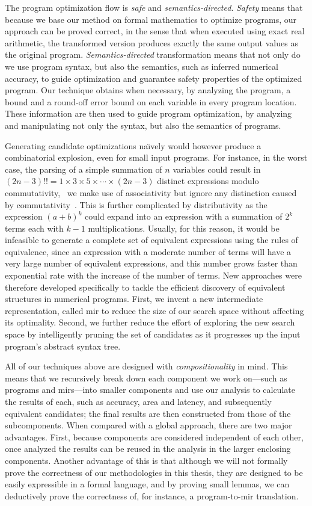 The program optimization flow is \emph{safe} and \emph{semantics-directed}.
\emph{Safety} means that because we base our method on formal mathematics to
optimize programs, our approach can be proved correct, in the sense that when
executed using exact real arithmetic, the transformed version produces exactly
the same output values as the original program. \emph{Semantics-directed}
transformation means that not only do we use program syntax, but also the
semantics, such as inferred numerical accuracy, to guide optimization and
guarantee safety properties of the optimized program.  Our technique obtains
when necessary, by analyzing the program, a bound and a round-off error bound
on each variable in every program location.  These information are then used to
guide program optimization, by analyzing and manipulating not only the syntax,
but also the semantics of programs.

Generating candidate optimizations na{\"\i}vely would however produce a
combinatorial explosion, even for small input programs.  For instance, in the
worst case, the parsing of a simple summation of $n$ variables could result
in $(2n - 3)!! = 1 \times 3 \times 5 \times \cdots \times (2n - 3)$ distinct
expressions modulo commutativity, \ie~we make use of associativity but ignore
any distinction caused by commutativity~\cite{ioualalen, mouilleron}.  This is
further complicated by distributivity as the expression ${(a + b)}^k$ could
expand into an expression with a summation of $2^k$ terms each with $k - 1$
multiplications.  Usually, for this reason, it would be infeasible to generate
a complete set of equivalent expressions using the rules of equivalence, since
an expression with a moderate number of terms will have a very large number of
equivalent expressions, and this number grows faster than exponential rate with
the increase of the number of terms.  New approaches were therefore developed
specifically to tackle the efficient discovery of equivalent structures in
numerical programs.  First, we invent a new intermediate representation,
called \gls{mir} to reduce the size of our search space without affecting its
optimality.  Second, we further reduce the effort of exploring the new search
space by intelligently pruning the set of candidates as it progresses up the
input program's abstract syntax tree.

All of our techniques above are designed with \emph{compositionality} in mind.
This means that we recursively break down each component we work on---such
as programs and \glspl{mir}---into smaller components and use our analysis
to calculate the results of each, such as accuracy, area and latency, and
subsequently equivalent candidates; the final results are then constructed from
those of the subcomponents.  When compared with a global approach, there are
two major advantages.  First, because components are considered independent
of each other, once analyzed the results can be reused in the analysis in the
larger enclosing components.  Another advantage of this is that although we
will not formally prove the correctness of our methodologies in this thesis,
they are designed to be easily expressible in a formal language, and by proving
small lemmas, we can deductively prove the correctness of, for instance, a
program-to-\gls{mir} translation.
